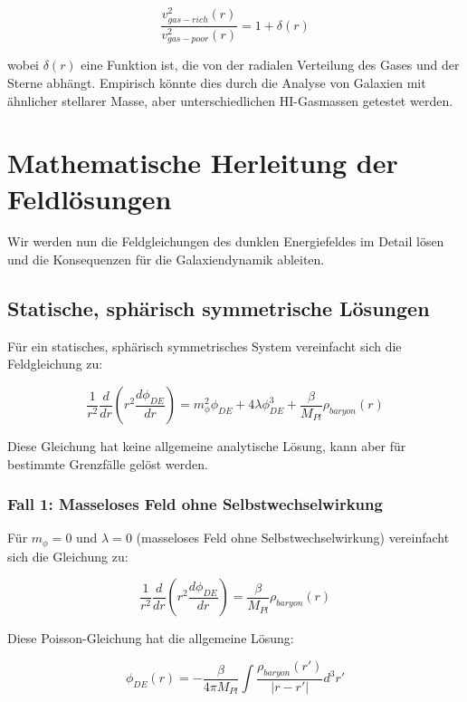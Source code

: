 \documentclass[a4paper,12pt]{article}
\begin{document}
	\begin{equation}
		\frac{v^2_{gas-rich}(r)}{v^2_{gas-poor}(r)} = 1 + \delta(r)
	\end{equation}
	
	wobei $\delta(r)$ eine Funktion ist, die von der radialen Verteilung des Gases und der Sterne abhängt. Empirisch könnte dies durch die Analyse von Galaxien mit ähnlicher stellarer Masse, aber unterschiedlichen HI-Gasmassen getestet werden.
	
	\section{Mathematische Herleitung der Feldlösungen}
	
	Wir werden nun die Feldgleichungen des dunklen Energiefeldes im Detail lösen und die Konsequenzen für die Galaxiendynamik ableiten.
	
	\subsection{Statische, sphärisch symmetrische Lösungen}
	
	Für ein statisches, sphärisch symmetrisches System vereinfacht sich die Feldgleichung zu:
	
	\begin{equation}
		\frac{1}{r^2}\frac{d}{dr}\left(r^2\frac{d\phi_{DE}}{dr}\right) = m_{\phi}^2\phi_{DE} + 4\lambda\phi_{DE}^3 + \frac{\beta}{M_{Pl}}\rho_{baryon}(r)
	\end{equation}
	
	Diese Gleichung hat keine allgemeine analytische Lösung, kann aber für bestimmte Grenzfälle gelöst werden.
	
	\subsubsection{Fall 1: Masseloses Feld ohne Selbstwechselwirkung}
	
	Für $m_{\phi} = 0$ und $\lambda = 0$ (masseloses Feld ohne Selbstwechselwirkung) vereinfacht sich die Gleichung zu:
	
	\begin{equation}
		\frac{1}{r^2}\frac{d}{dr}\left(r^2\frac{d\phi_{DE}}{dr}\right) = \frac{\beta}{M_{Pl}}\rho_{baryon}(r)
	\end{equation}
	
	Diese Poisson-Gleichung hat die allgemeine Lösung:
	
	\begin{equation}
		\phi_{DE}(r) = -\frac{\beta}{4\pi M_{Pl}} \int \frac{\rho_{baryon}(r')}{|r-r'|} d^3r'
	\end{equation}
	
\end{document}
